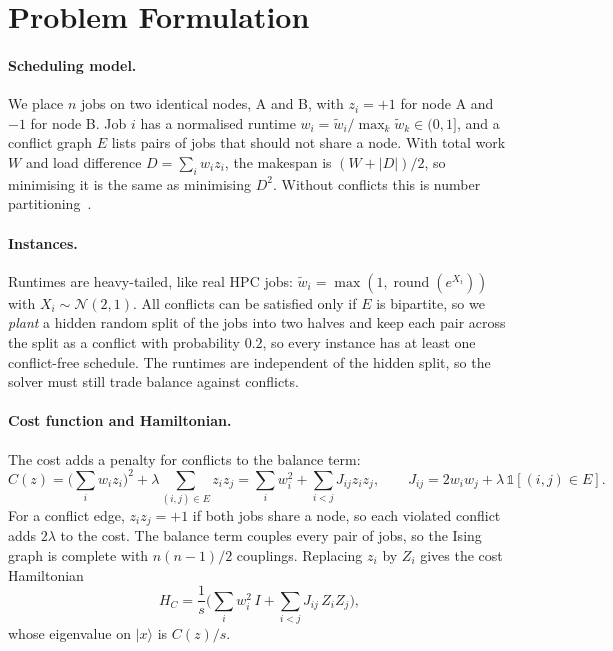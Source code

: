 
\section{Problem Formulation}
\label{sec:formulation}

\paragraph{Scheduling model.}
We place $n$ jobs on two identical nodes, A and B, with $z_i = +1$ for node A and $-1$ for node B.
Job $i$ has a normalised runtime $w_i = \tilde w_i / \max_k \tilde w_k \in (0, 1]$, and a conflict graph $E$ lists pairs of jobs that should not share a node.
With total work $W$ and load difference $D = \sum_i w_i z_i$, the makespan is $(W + |D|)/2$, so minimising it is the same as minimising $D^2$.
Without conflicts this is number partitioning~\cite{lucas2014, karmarkar1982}.

\paragraph{Instances.}
Runtimes are heavy-tailed, like real HPC jobs: $\tilde w_i = \max(1, \operatorname{round}(e^{X_i}))$ with $X_i \sim \mathcal{N}(2, 1)$.
All conflicts can be satisfied only if $E$ is bipartite, so we \emph{plant} a hidden random split of the jobs into two halves and keep each pair across the split as a conflict with probability $0.2$, so every instance has at least one conflict-free schedule.
The runtimes are independent of the hidden split, so the solver must still trade balance against conflicts.

\paragraph{Cost function and Hamiltonian.}
The cost adds a penalty for conflicts to the balance term:
\begin{equation}
  C(z) = \Big( \sum_{i} w_i z_i \Big)^2 + \lambda \sum_{(i,j) \in E} z_i z_j
  = \sum_i w_i^2 + \sum_{i<j} J_{ij} z_i z_j,
  \qquad
  J_{ij} = 2 w_i w_j + \lambda \, \mathbb{1}[(i,j) \in E].
  \label{eq:ising}
\end{equation}
For a conflict edge, $z_i z_j = +1$ if both jobs share a node, so each violated conflict adds $2\lambda$ to the cost.
The balance term couples every pair of jobs, so the Ising graph is complete with $n(n-1)/2$ couplings.
Replacing $z_i$ by $Z_i$ gives the cost Hamiltonian
\begin{equation}
  H_C = \frac{1}{s} \Big( \sum_i w_i^2 \, I + \sum_{i<j} J_{ij}\, Z_i Z_j \Big),
  \label{eq:hamiltonian}
\end{equation}
whose eigenvalue on $\lvert x \rangle$ is $C(z)/s$.


